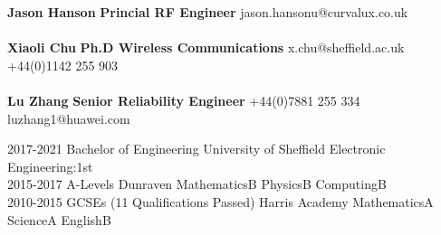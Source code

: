 \documentclass[9pt]{developercv} %
\begin{document}
\begin{minipage}[t]{0.40\textwidth}%

	\textbf{Jason Hanson} \hfill \textbf{Princial RF Engineer}\newline
	\hspace*{0.5cm}jason.hansonu@curvalux.co.uk\\\\
	\textbf{Xiaoli Chu} \hfill \textbf{Ph.D Wireless Communications}\newline
	\hspace*{0.5cm}x.chu@sheffield.ac.uk\newline
	\hspace*{0.5cm}+44(0)1142 255 903\\\\
	\textbf{Lu Zhang} \hfill \textbf{Senior Reliability Engineer}\newline
	\hspace*{0.5cm}+44(0)7881 255 334\newline
	\hspace*{0.5cm}luzhang1@huawei.com\newline
	
\end{minipage}
\hspace*{0.5cm}
\begin{minipage}[t]{0.57\textwidth}

	\halfentry
		{2017-2021}
		{Bachelor of Engineering}
		{University of Sheffield}
		{\hspace*{0.5cm}Electronic Engineering:\hfill1st}\\
		\halfentry
		{2015-2017}
		{A-Levels}
		{Dunraven}
		{
			\hspace*{0.5cm}Mathematics\hfill B\newline
			\hspace*{0.5cm}Physics\hfill B\newline
			\hspace*{0.5cm}Computing\hfill B%
		}\\
	\halfentry
		{2010-2015}
		{GCSEs (11 Qualifications Passed)}
		{Harris Academy}
		{
			\hspace*{0.5cm}Mathematics\hfill A\newline
			\hspace*{0.5cm}Science\hfill A\newline
			\hspace*{0.5cm}English\hfill B%
		}
\end{minipage}%
\end{document}
